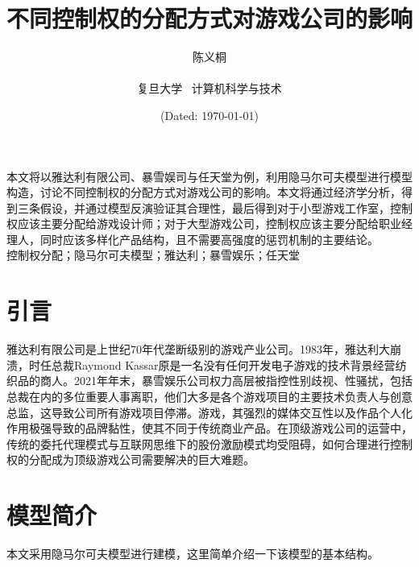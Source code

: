 \documentclass[hyperref]{ctexart}
\title{\textbf{不同控制权的分配方式对游戏公司的影响}}
\author{\sffamily 陈义桐 \\ \\复旦大学 \ 计算机科学与技术}
\date{(Dated: \today)}
\begin{document}
	\maketitle
		本文将以雅达利有限公司、暴雪娱司与任天堂为例，利用隐马尔可夫模型进行模型构造，讨论不同控制权的分配方式对游戏公司的影响。本文将通过经济学分析，得到三条假设，并通过模型反演验证其合理性，最后得到对于小型游戏工作室，控制权应该主要分配给游戏设计师；对于大型游戏公司，控制权应该主要分配给职业经理人，同时应该多样化产品结构，且不需要高强度的惩罚机制的主要结论。\\
		
		控制权分配；隐马尔可夫模型；雅达利；暴雪娱乐；任天堂
	\begin{multicols}{2}
	\section{引言}
	雅达利有限公司是上世纪70年代垄断级别的游戏产业公司。1983年，雅达利大崩溃，时任总裁Raymond Kassar原是一名没有任何开发电子游戏的技术背景经营纺织品的商人。2021年年末，暴雪娱乐公司权力高层被指控性别歧视、性骚扰，包括总裁在内的多位重要人事离职，他们大多是各个游戏项目的主要技术负责人与创意总监，这导致公司所有游戏项目停滞。游戏，其强烈的媒体交互性以及作品个人化作用极强导致的品牌黏性，使其不同于传统商业产品。在顶级游戏公司的运营中，传统的委托代理模式与互联网思维下的股份激励模式均受阻碍，如何合理进行控制权的分配成为顶级游戏公司需要解决的巨大难题。
	\section{模型简介}
	本文采用隐马尔可夫模型进行建模，这里简单介绍一下该模型的基本结构。

\end{multicols}
\end{document}
